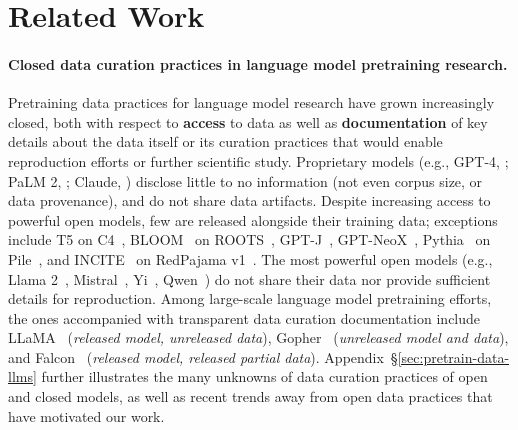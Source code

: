\section{Related Work}
\label{sec:related-work}

\paragraph{Closed data curation practices in language model pretraining research.} 
Pretraining data practices for language model research have grown increasingly closed, both with respect to \textbf{access} to data as well as \textbf{documentation} of key details about the data itself or its curation practices that would enable reproduction efforts or further scientific study.
Proprietary models (e.g., GPT-4, \citealp{OpenAI2023GPT4TR}; PaLM 2, \citealp{Anil2023PaLM2T}; Claude, \citealp{claude-announce}) disclose little to no information (not even corpus size, or data provenance), and do not share data artifacts.
Despite increasing access to powerful open models, few are released alongside their training data; exceptions include T5 on C4~\citep{raffel2020exploring}, BLOOM~\citep{leong-etal-2022-bloom} on ROOTS~\citep{piktus-etal-2023-roots}, GPT-J~\citep{gpt-j}, GPT-NeoX~\citep{Black2022GPTNeoX20BAO}, Pythia~\citep{Biderman2023PythiaAS} on Pile~\citep{Gao2020ThePA}, and INCITE~\citep{together2023incite} on RedPajama v1~\citep{together2023redpajama}.
The most powerful open models (e.g., Llama 2~\citep{Touvron2023Llama2O}, Mistral~\citep{mistral}, Yi~\citep{qwen}, Qwen~\citep{yi34b}) do not share their data nor provide sufficient details for reproduction.
Among large-scale language model pretraining efforts, the ones accompanied with transparent data curation documentation include LLaMA~\citep{Touvron2023LLaMAOA} (\emph{released model, unreleased data}), Gopher~\citep{Rae2021ScalingLM} (\emph{unreleased model and data}), and Falcon~\citep{falcon40b} (\emph{released model, released partial data}).
Appendix~\S\ref{sec:pretrain-data-llms} further illustrates the many unknowns of data curation practices of open and closed models, as well as recent trends away from open data practices that have motivated our work.


